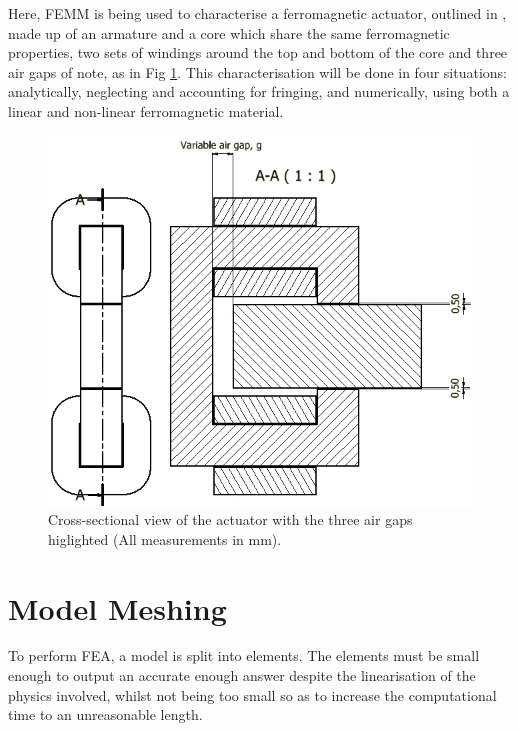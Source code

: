 \documentclass[a4paper]{IEEEtran}
\begin{document}
    Here, FEMM is being used to characterise a ferromagnetic actuator, outlined in \cite{labPartA}, made up of an armature and a core which share the same ferromagnetic properties, two sets of windings around the top and bottom of the core and three air gaps of note, as in Fig \ref{xsection}. This characterisation will be done in four situations: analytically, neglecting and accounting for fringing, and numerically, using both a linear and non-linear ferromagnetic material. 

    \begin{figure}[ht]
        \includegraphics[width = \linewidth]{actuator-2.jpg}
        \caption{Cross-sectional view of the actuator with the three air gaps higlighted (All measurements in mm).}
        \label{xsection} 
    \end{figure}

\section{Model Meshing}

    To perform FEA, a model is split into elements. The elements must be small enough to output an accurate enough answer despite the linearisation of the physics involved, whilst not being too small so as to increase the computational time to an unreasonable length.
\end{document}
